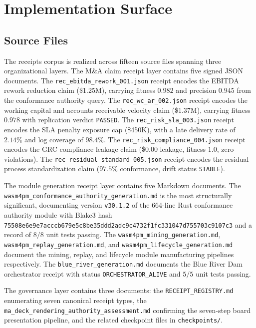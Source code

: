\section{Implementation Surface}
\label{sec:receipts-implementation}

\subsection{Source Files}
\label{sec:receipts-implementation-source}

The receipts corpus is realized across fifteen source files spanning three organizational
layers. The M\&A claim receipt layer contains five signed JSON documents. The
\texttt{rec\_ebitda\_rework\_001.json} receipt encodes the EBITDA rework reduction claim
(\$1.25M), carrying fitness $0.982$ and precision $0.945$ from the conformance authority
query. The \texttt{rec\_wc\_ar\_002.json} receipt encodes the working capital and accounts
receivable velocity claim (\$1.37M), carrying fitness $0.978$ with replication verdict
\texttt{PASSED}. The \texttt{rec\_risk\_sla\_003.json} receipt encodes the SLA penalty
exposure cap (\$450K), with a late delivery rate of $2.14\%$ and log coverage of $98.4\%$.
The \texttt{rec\_risk\_compliance\_004.json} receipt encodes the GRC compliance leakage
claim (\$0.00 leakage, fitness $1.0$, zero violations). The
\texttt{rec\_residual\_standard\_005.json} receipt encodes the residual process
standardization claim ($97.5\%$ conformance, drift status \texttt{STABLE}).

The module generation receipt layer contains five Markdown documents. The
\texttt{wasm4pm\_conformance\_authority\_generation.md} is the most structurally significant,
documenting version \texttt{v30.1.2} of the 664-line Rust conformance authority module with
Blake3 hash \texttt{75508e6e9e7acccb679e5c8be35ddd2adc9c4732f1fc331047d755703c9107c3} and
a record of $8/8$ unit tests passing. The \texttt{wasm4pm\_mining\_generation.md},
\texttt{wasm4pm\_replay\_generation.md}, and \texttt{wasm4pm\_lifecycle\_generation.md}
document the mining, replay, and lifecycle module manufacturing pipelines respectively.
The \texttt{blue\_river\_generation.md} documents the Blue River Dam orchestrator receipt
with status \texttt{ORCHESTRATOR\_ALIVE} and $5/5$ unit tests passing.

The governance layer contains three documents: the \texttt{RECEIPT\_REGISTRY.md} enumerating
seven canonical receipt types, the \texttt{ma\_deck\_rendering\_authority\_assessment.md}
confirming the seven-step board presentation pipeline, and the related checkpoint files
in \texttt{checkpoints/}.


